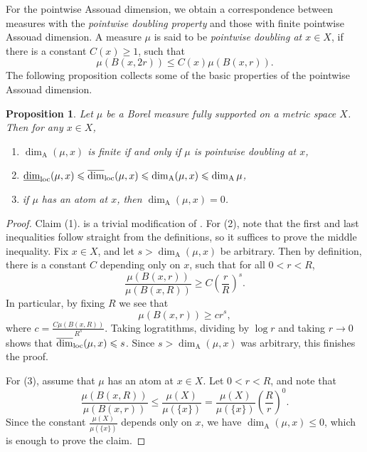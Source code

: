 \documentclass{PRM}
\newcommand{\updim}{\overline{\dim}}
\newcommand{\lowdim}{\underline{\dim}}
\newcommand{\adim}{\dim_{\mathrm{A}}}
\theoremstyle{plain}
\newtheorem{prop}[thm]{Proposition}
\theoremstyle{definition}
\theoremstyle{remark}
\begin{document}
For the pointwise Assouad dimension, we obtain a correspondence between measures with the \emph{pointwise doubling property} and those with finite pointwise Assouad dimension. A measure $\mu$ is said to be \emph{pointwise doubling at $x\in X$}, if there is a constant $C(x)\geq 1$, such that
\begin{equation*}
    \mu(B(x,2r))\leq C(x)\mu(B(x,r)).
\end{equation*}
The following proposition collects some of the basic properties of the pointwise Assouad dimension.
\begin{prop}\label{prop:basic_properties}
Let $\mu$ be a Borel measure fully supported on a metric space $X$. Then for any $x\in X$,
\begin{enumerate}
    \item[(1)] $\dim_{\mathrm{A}}(\mu,x)$ is finite if and only if $\mu$ is pointwise doubling at $x$,
    \item[(2)] $\lowdim_{\textnormal{loc}}(\mu,x)\leq\updim_{\textnormal{loc}}(\mu,x)\leq \dim_{\mathrm{A}}(\mu,x)\leq \adim\mu$,
    \item[(3)] if $\mu$ has an atom at $x$, then $\dim_{\mathrm{A}}(\mu,x)=0$.
\end{enumerate}
\end{prop}
\begin{proof}
    Claim (1). is a trivial modification of \cite[Lemma 4.1.1]{F}. For (2), note that the first and last inequalities follow straight from the definitions, so it suffices to prove the middle inequality. Fix $x\in X$, and let $s> \dim_{\mathrm{A}}(\mu,x)$ be arbitrary. Then by definition, there is a constant $C$ depending only on $x$, such that for all $0<r<R$,
    \begin{equation*}
        \frac{\mu(B(x,r))}{\mu(B(x,R))}\geq C\left(\frac{r}{R}\right)^s.
    \end{equation*}
    In particular, by fixing $R$ we see that
    \begin{equation*}
        \mu(B(x,r))\geq c r^s,
    \end{equation*}
    where $c=\frac{C\mu(B(x,R))}{R^s}$. Taking logratithms, dividing by $\log r$ and taking $r\to 0$ shows that $\updim_{\textnormal{loc}}(\mu,x)\leq s$. Since $s>\dim_{\mathrm{A}}(\mu,x)$ was arbitrary, this finishes the proof.

    For (3), assume that $\mu$ has an atom at $x\in X$. Let $0<r<R$, and note that
    \begin{equation*}
        \frac{\mu(B(x,R))}{\mu(B(x,r))}\leq \frac{\mu(X)}{\mu(\{x\})}=\frac{\mu(X)}{\mu(\{x\})}\left(\frac{R}{r}\right)^0.
    \end{equation*}
    Since the constant $\frac{\mu(X)}{\mu(\{x\})}$ depends only on $x$, we have $\dim_{\mathrm{A}}(\mu,x)\leq 0$, which is enough to prove the claim.
\end{proof}
\end{document}
